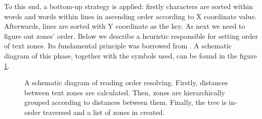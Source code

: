 To this end, a bottom-up strategy is applied: firstly characters are sorted within words and words within lines in ascending order according to X coordinate value. Afterwards, lines are sorted with Y coordinate as the key. As next we need to figure out zones' order. Below we describe a heuristic responsible for setting order of text zones. Its fundamental principle was borrowed from \cite{Agrawal2009}. A schematic diagram of this phase, together with the symbols used, can be found in the figure \ref{fig:reading_order}.
\begin{figure}[ht!]
  \centering
  
  \caption{A schematic diagram of reading order resolving. Firstly, distances between text zones are calculated. Then, zones are hierarchically grouped according to distances between them. Finally, the tree is in-order traversed and a list of zones in created.}
  \label{fig:reading_order}
\end{figure}
